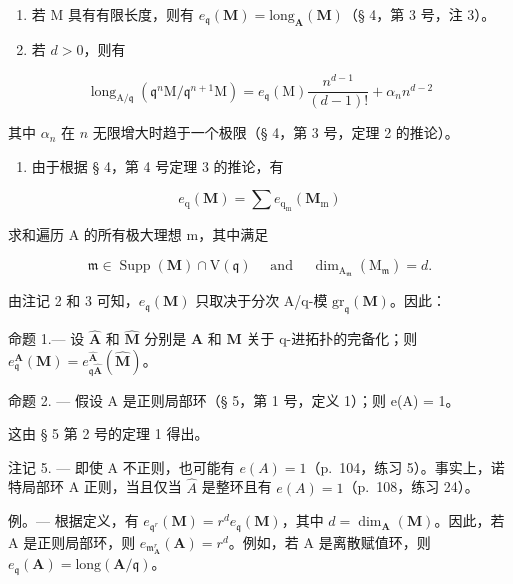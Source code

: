 \begin{enumerate}
\def\labelenumi{\arabic{enumi})}
\setcounter{enumi}{1}
\item
  若 M 具有有限长度，则有 \(e_{\mathfrak{q}}(\mathbf{M}) = \mathrm{long}_{\mathbf{A}}(\mathbf{M})\)（§ 4，第 3 号，注 3）。
\item
  若 \(d > 0\)，则有
\end{enumerate}

\[
\operatorname{long} _ {\mathrm{A} / \mathfrak {q}} (\mathfrak {q} ^ {n} \mathrm{M} / \mathfrak {q} ^ {n + 1} \mathrm{M}) = e _ {\mathfrak {q}} (\mathrm{M}) \frac {n ^ {d - 1}}{(d - 1) !} + \alpha_ {n} n ^ {d - 2}
\]

其中 \(\alpha_{n}\) 在 \(n\) 无限增大时趋于一个极限（§ 4，第 3 号，定理 2 的推论）。

\begin{enumerate}
\def\labelenumi{\arabic{enumi})}
\setcounter{enumi}{3}
\tightlist
\item
  由于根据 § 4，第 4 号定理 3 的推论，有
\end{enumerate}

\[
e _ {\mathrm{q}} (\mathbf {M}) = \sum e _ {\mathrm{q} _ {\mathrm{m}}} (\mathbf {M} _ {\mathrm{m}})
\]

求和遍历 A 的所有极大理想 m，其中满足

\[
\mathfrak {m} \in \operatorname{Supp} (\mathbf {M}) \cap \mathrm{V} (\mathfrak {q}) \quad \text { and } \quad \dim_ {\mathrm{A} _ {\mathfrak {m}}} (\mathrm{M} _ {\mathfrak {m}}) = d  .
\]

由注记 2 和 3 可知，\(e_{\mathfrak{q}}(\mathbf{M})\) 只取决于分次 A/q-模 \(\mathrm{gr}_{\mathfrak{q}}(\mathbf{M})\)。因此：

命题 1.--- 设 \(\hat{\mathbf{A}}\) 和 \(\hat{\mathbf{M}}\) 分别是 \(\mathbf{A}\) 和 \(\mathbf{M}\) 关于 q-进拓扑的完备化；则 \(e_{\mathfrak{q}}^{\mathbf{A}}(\mathbf{M}) = e_{\mathfrak{q}\hat{\mathbf{A}}}^{\hat{\mathbf{A}}}(\hat{\mathbf{M}})\)。

命题 2. --- 假设 A 是正则局部环（§ 5，第 1 号，定义 1）；则 e(A) = 1。

这由 § 5 第 2 号的定理 1 得出。

注记 5. --- 即使 A 不正则，也可能有 \(e(A) = 1\)（p.~104，练习 5）。事实上，诺特局部环 A 正则，当且仅当 \(\hat{A}\) 是整环且有 \(e(A) = 1\)（p.~108，练习 24）。

例。--- 根据定义，有 \(e_{\mathfrak{q}^{r}}(\mathbf{M}) = r^{d}e_{\mathfrak{q}}(\mathbf{M})\)，其中 \(d = \dim_{\mathbf{A}}(\mathbf{M})\)。因此，若 A 是正则局部环，则 \(e_{\mathfrak{m}_{\mathbf{A}}^{r}}(\mathbf{A}) = r^{d}\)。例如，若 A 是离散赋值环，则 \(e_{\mathfrak{q}}(\mathbf{A}) = \text{long}(\mathbf{A}/\mathfrak{q})\)。

